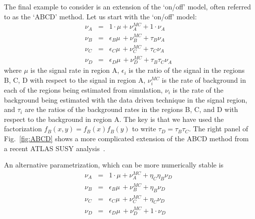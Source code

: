 The final example to consider is an extension of the `on/off' model, often referred to as the `ABCD' method.  Let us start with the `on/off' model:
\begin{eqnarray}
\nu_A &=& 1\cdot\mu + \nu_A^{MC} + 1\cdot\nu_A \\\nonumber
\nu_B &=& \epsilon_B\mu \,+ \nu_B^{MC} + \tau_B\nu_A \\\nonumber
\nu_C &=& \epsilon_C\mu \,+ \nu_C^{MC} + \tau_C\nu_A \\\nonumber
\nu_D &=& \epsilon_D\mu \,+ \nu_D^{MC} + \tau_B\tau_C\nu_A 
\end{eqnarray}
where $\mu$ is the signal rate in region A, $\epsilon_i$ is the ratio of the signal in the regions B, C, D with respect to the signal in region A, $\nu_i^{MC}$ is the rate of background in each of the regions being estimated from simulation,  $\nu_i$ is the rate of the background being estimated with the data driven technique in the signal region, and $\tau_i$ are the ratios of the background rates in the regions B, C, and D with respect to the background in region A.  The key is that we have used the factorization $f_B(x,y)=f_B(x)f_B(y)$ to write $\tau_D=\tau_B\tau_C$.  The right panel of Fig.~\ref{fig:ABCD} shows a more complicated extension of the ABCD method from a recent ATLAS SUSY analysis~\cite{ATLAS:2011ad}.



An alternative parametrization, which can be more numerically stable is\\
\begin{eqnarray}
\nu_A &=& 1\cdot\mu + \nu_A^{MC} + \eta_C\eta_B\nu_D \\\nonumber
\nu_B &=& \epsilon_B\mu \,+ \nu_B^{MC} + \eta_B\nu_D \\\nonumber
\nu_C &=& \epsilon_C\mu \,+ \nu_C^{MC} + \eta_C\nu_D \\\nonumber
\nu_D &=& \epsilon_D\mu \,+ \nu_D^{MC} + 1\cdot\nu_D 
\end{eqnarray}
